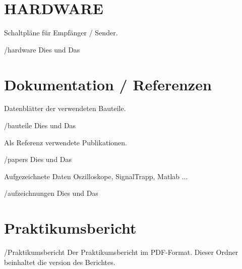 \section{HARDWARE}
Schaltpläne für Empfänger / Sender.
\begin{FileList}{/hardware}
 Dies und Das %
\end{FileList}

\section{Dokumentation / Referenzen}
Datenblätter der verwendeten Bauteile.
\begin{FileList}{/bauteile}
 Dies und Das %
\end{FileList}

Als Referenz verwendete Publikationen.
\begin{FileList}{/papers}
 Dies und Das %
\end{FileList}

Aufgezeichnete Daten Oszilloskope, SignalTrapp, Matlab ...
\begin{FileList}{/aufzeichnungen}
 Dies und Das %
\end{FileList}

\section{Praktikumsbericht}
\begin{FileList}{/Praktikumsbericht}
 Der Praktikumsbericht im PDF-Format.
 Dieser Ordner beinhaltet die \latex version des Berichtes.%
\end{FileList}
